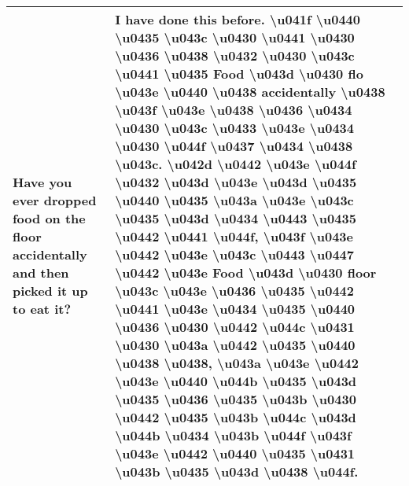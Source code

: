 \begin{longtable}{p{} p{}}
Have you ever dropped food on the floor accidentally and then picked it up to eat it? & I have done this before.  \textbackslash u041f \textbackslash u0440 \textbackslash u0435 \textbackslash u043c \textbackslash u0430 \textbackslash u0441 \textbackslash u0430 \textbackslash u0436 \textbackslash u0438 \textbackslash u0432 \textbackslash u0430 \textbackslash u043c  \textbackslash u0441 \textbackslash u0435 Food  \textbackslash u043d \textbackslash u0430 flo \textbackslash u043e \textbackslash u0440 \textbackslash u0438 accidentally  \textbackslash u0438  \textbackslash u043f \textbackslash u043e \textbackslash u0438 \textbackslash u0436 \textbackslash u0434 \textbackslash u0430 \textbackslash u043c  \textbackslash u0433 \textbackslash u043e  \textbackslash u0434 \textbackslash u0430  \textbackslash u044f \textbackslash u0437 \textbackslash u0434 \textbackslash u0438 \textbackslash u043c.  \textbackslash u042d \textbackslash u0442 \textbackslash u043e  \textbackslash u044f \textbackslash u0432 \textbackslash u043d \textbackslash u043e  \textbackslash u043d \textbackslash u0435  \textbackslash u0440 \textbackslash u0435 \textbackslash u043a \textbackslash u043e \textbackslash u043c \textbackslash u0435 \textbackslash u043d \textbackslash u0434 \textbackslash u0443 \textbackslash u0435 \textbackslash u0442 \textbackslash u0441 \textbackslash u044f,  \textbackslash u043f \textbackslash u043e \textbackslash u0442 \textbackslash u043e \textbackslash u043c \textbackslash u0443  \textbackslash u0447 \textbackslash u0442 \textbackslash u043e Food  \textbackslash u043d \textbackslash u0430 floor  \textbackslash u043c \textbackslash u043e \textbackslash u0436 \textbackslash u0435 \textbackslash u0442  \textbackslash u0441 \textbackslash u043e \textbackslash u0434 \textbackslash u0435 \textbackslash u0440 \textbackslash u0436 \textbackslash u0430 \textbackslash u0442 \textbackslash u044c  \textbackslash u0431 \textbackslash u0430 \textbackslash u043a \textbackslash u0442 \textbackslash u0435 \textbackslash u0440 \textbackslash u0438 \textbackslash u0438,  \textbackslash u043a \textbackslash u043e \textbackslash u0442 \textbackslash u043e \textbackslash u0440 \textbackslash u044b \textbackslash u0435  \textbackslash u043d \textbackslash u0435 \textbackslash u0436 \textbackslash u0435 \textbackslash u043b \textbackslash u0430 \textbackslash u0442 \textbackslash u0435 \textbackslash u043b \textbackslash u044c \textbackslash u043d \textbackslash u044b  \textbackslash u0434 \textbackslash u043b \textbackslash u044f  \textbackslash u043f \textbackslash u043e \textbackslash u0442 \textbackslash u0440 \textbackslash u0435 \textbackslash u0431 \textbackslash u043b \textbackslash u0435 \textbackslash u043d \textbackslash u0438 \textbackslash u044f. \\
\bottomrule
\end{longtable}

\clearpage